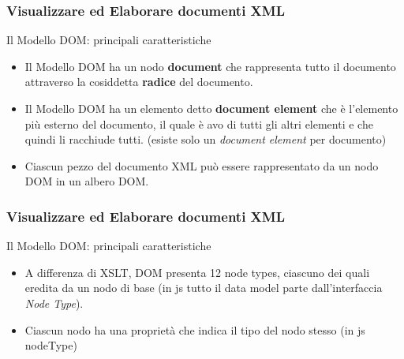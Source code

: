 \begin{frame}
    \frametitle{Visualizzare ed Elaborare documenti XML}
    \addtocounter{nframe}{1}
    

     \begin{block}{Il Modello DOM: principali caratteristiche}
        \begin{itemize}
            \item Il Modello DOM ha un nodo \textbf{document} che rappresenta tutto il documento attraverso la cosiddetta \textbf{radice} del documento.
            \item Il Modello DOM ha un elemento detto \textbf{document element} che è l'elemento più esterno del documento, il quale è avo di tutti gli altri elementi e che quindi li racchiude tutti. (esiste solo un \textit{document element} per documento)
            \item Ciascun pezzo del documento XML può essere rappresentato da un nodo DOM in un albero DOM.
        \end{itemize}
     \end{block}
     
\end{frame}

\begin{frame}
    \frametitle{Visualizzare ed Elaborare documenti XML}
    \addtocounter{nframe}{1}
    

     \begin{block}{Il Modello DOM: principali caratteristiche}
        \begin{itemize}
            \item A differenza di XSLT, DOM presenta 12 node types, ciascuno dei quali eredita da un nodo di base (in js tutto il data model parte dall'interfaccia \textit{Node Type}).
            \item Ciascun nodo ha una proprietà che indica il tipo del nodo stesso (in js nodeType)
        \end{itemize}
     \end{block}
     
\end{frame}

